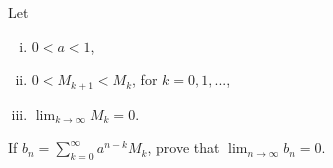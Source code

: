 Let

\begin{enumerate}[(i)]

\item $0 < a < 1$,
\item $0 < M_{k + 1} < M_k$, for $k = 0, 1, ...$,
\item $\displaystyle{ \lim_{k \to \infty} M_k = 0 }$.

\end{enumerate}

If $\displaystyle{
  b_n = \sum_{k = 0}^\infty a^{n - k} M_k
}$, prove that $\displaystyle{
  \lim_{n \to \infty} b_n = 0
}$.
